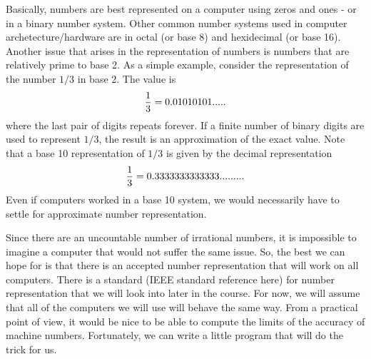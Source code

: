 \documentclass[10pt,fleqn]{article}
\begin{document}
Basically, numbers are best represented on a computer using zeros and ones -
or in a binary number system. Other common number systems used in computer
archetecture/hardware are in octal (or base 8) and hexidecimal (or base 16).
Another issue that arises in the representation of numbers is numbers that are
relatively prime to base 2. As a simple example, consider the representation of
the number $1/3$ in base 2.  The value is
$${1\over 3} = 0.01010101.....$$
where the last pair of digits repeats forever. If a finite number of binary
digits are used to represent $1/3$, the result is an approximation of the exact
value. Note that a base 10 representation of $1/3$ is given by the decimal
representation
$${1\over 3} = 0.3333333333333.........$$
Even if computers worked in a base 10 system, we would necessarily have to
settle for approximate number representation.

Since there are an uncountable number of irrational numbers, it is impossible to
imagine a computer that would not suffer the same issue. So, the best we can
hope for is that there is an accepted number representation that will work on
all computers. There is a standard (IEEE standard reference here) for number
representation that we will look into later in the course. For now, we will
assume that all of the computers we will use will behave the same way. From a
practical point of view, it would be nice to be able to compute the limits of
the accuracy of machine numbers. Fortunately, we can write a little program that
will do the trick for us.
\end{document}
